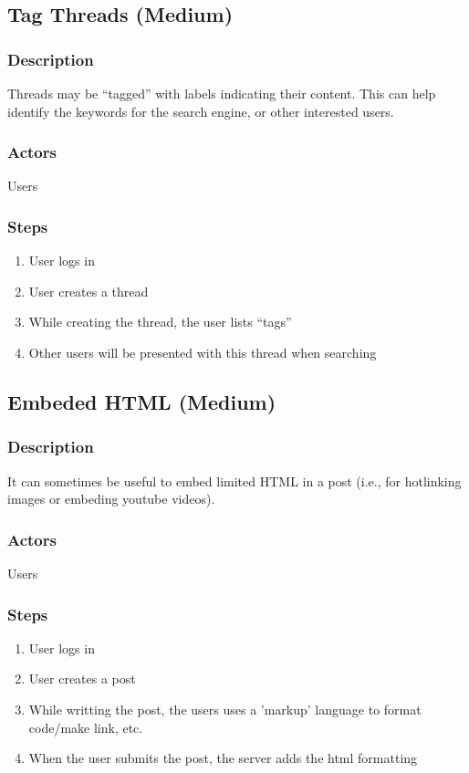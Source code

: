 \documentclass[12pt]{scrartcl}
\begin{document}
\subsection{Tag Threads (Medium)}
\subsubsection{Description}

Threads may be ``tagged'' with labels indicating their content. This can help identify the keywords for the search engine, or other interested users.

\subsubsection{Actors}

Users

\subsubsection{Steps}
\begin{enumerate}
\item User logs in
\item User creates a thread
\item While creating the thread, the user lists ``tags''
\item Other users will be presented with this thread when searching
\end{enumerate}


\subsection{Embeded HTML (Medium)}
\subsubsection{Description}

It can sometimes be useful to embed limited HTML in a post (i.e., for hotlinking images or embeding youtube videos).

\subsubsection{Actors}

Users

\subsubsection{Steps}
\begin{enumerate}
\item User logs in
\item User creates a post
\item While writting the post, the users uses a 'markup' language to format code/make link, etc.
\item When the user submits the post, the server adds the html formatting
\end{enumerate}
\end{document}
